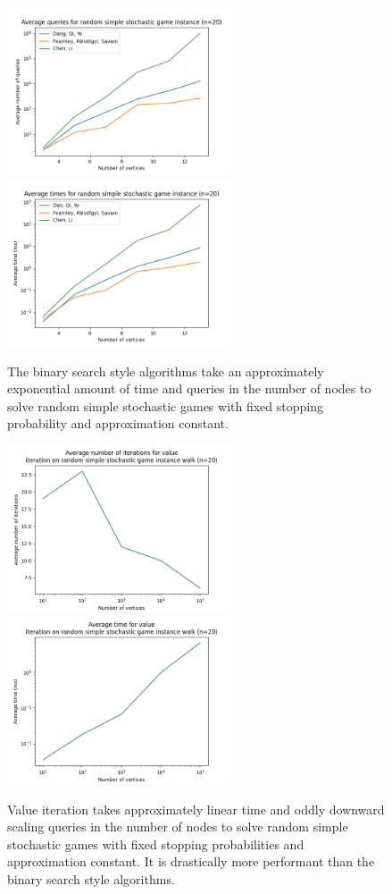   \vspace{-22pt}
  \begin{figure}[H] 
      \centering
      \includegraphics[width=2.6in]{plots/simple_queries.png}
      \centering
      \includegraphics[width=2.6in]{plots/simple_times.png}
      \caption{ The binary search style algorithms take an approximately exponential
      amount of time and queries in the number of nodes
      to solve random simple stochastic games with fixed stopping probability
      and approximation constant.} \label{simpleMainPlot}
  \end{figure}
  \vspace{-20pt}
  \begin{figure}[H]
      \centering
      \includegraphics[width=2.6in]{plots/simple_iterations.png}
      \centering
      \includegraphics[width=2.6in]{plots/simple_iter_time.png}
      \caption{ Value iteration takes approximately linear time and oddly downward scaling
      queries in the number of nodes
      to solve random simple stochastic games with fixed stopping probabilities and approximation constant.
      It is drastically more performant than
      the binary search style algorithms.} \label{simpleWalkPlot}
  \end{figure}
